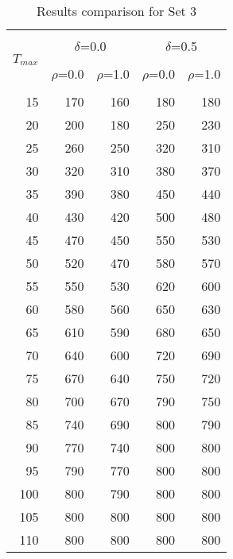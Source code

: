 \begin{table}[!htb]
\centering
{\renewcommand{\tabcolsep}{12pt}
\caption{Results comparison for Set 3\label{table:set3}}
\vspace{-0.75em}
\begin{tabular}{rrrrr}
\hline \\ [-1.8ex]
 \multirow{3}{*}{$T_{max}$}& \multicolumn{2}{c}{$\delta$=0.0}& \multicolumn{2}{c}{$\delta$=0.5} {\smallskip} \\  \cmidrule(lr){2-3} \cmidrule(lr){4-5} \\ [-1.8ex] 
 & $\rho$=0.0& $\rho$=1.0& $\rho$=0.0& $\rho$=1.0 \\ [-1.8ex] \\ \hline
15 & 170 & 160 & 180 & 180 \\
20 & 200 & 180 & 250 & 230 \\
25 & 260 & 250 & 320 & 310 \\
30 & 320 & 310 & 380 & 370 \\
35 & 390 & 380 & 450 & 440 \\
40 & 430 & 420 & 500 & 480 \\
45 & 470 & 450 & 550 & 530 \\
50 & 520 & 470 & 580 & 570 \\
55 & 550 & 530 & 620 & 600 \\
60 & 580 & 560 & 650 & 630 \\
65 & 610 & 590 & 680 & 650 \\
70 & 640 & 600 & 720 & 690 \\
75 & 670 & 640 & 750 & 720 \\
80 & 700 & 670 & 790 & 750 \\
85 & 740 & 690 & 800 & 790 \\
90 & 770 & 740 & 800 & 800 \\
95 & 790 & 770 & 800 & 800 \\
100 & 800 & 790 & 800 & 800 \\
105 & 800 & 800 & 800 & 800 \\
110 & 800 & 800 & 800 & 800 \\
 \hline
\end{tabular}
}
\end{table}

